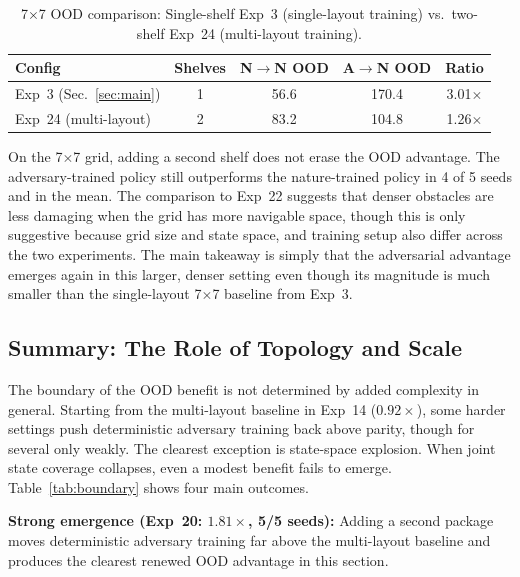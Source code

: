 \documentclass[sigconf]{aamas}
\begin{document}
\begin{table}[H]
\caption{7$\times$7 OOD comparison: Single-shelf Exp~3 (single-layout training) 
vs.\ two-shelf Exp~24 (multi-layout training).}
\label{tab:7x7-comparison}
\centering
\footnotesize
\begin{tabular}{lcccc}
\toprule
\textbf{Config} & \textbf{Shelves} & \textbf{N$\to$N OOD} & \textbf{A$\to$N OOD} & \textbf{Ratio} \\
\midrule
Exp~3 (Sec.~\ref{sec:main}) & 1 & 56.6 & 170.4 & 3.01$\times$ \\
Exp~24 (multi-layout)       & 2 & 83.2 & 104.8 & 1.26$\times$ \\
\bottomrule
\end{tabular}
\end{table}

On the 7$\times$7 grid, adding a second shelf does not erase the OOD advantage.
The adversary-trained policy still outperforms the nature-trained policy in 4 of
5 seeds and in the mean. The comparison to Exp~22 suggests that denser
obstacles are less damaging when the grid has more navigable space, though this
is only suggestive because grid size and state space, and training setup also
differ across the two experiments. The main takeaway is simply that the
adversarial advantage emerges again in this larger, denser setting even
though its magnitude is much smaller than the single-layout 7$\times$7 baseline
from Exp~3.

\subsection{Summary: The Role of Topology and Scale}

The boundary of the OOD benefit is not determined by added complexity in
general. Starting from the multi-layout baseline in Exp~14 ($0.92\times$),
some harder settings push deterministic adversary training back above parity, though for several only weakly.
The clearest exception is state-space explosion. When joint state coverage collapses, even a modest
benefit fails to emerge. Table~\ref{tab:boundary} shows four main outcomes.

\textbf{Strong emergence (Exp~20: $1.81\times$, 5/5 seeds):} Adding a second
package moves deterministic adversary training far above the multi-layout
baseline and produces the clearest renewed OOD advantage in this section.
\end{document}
